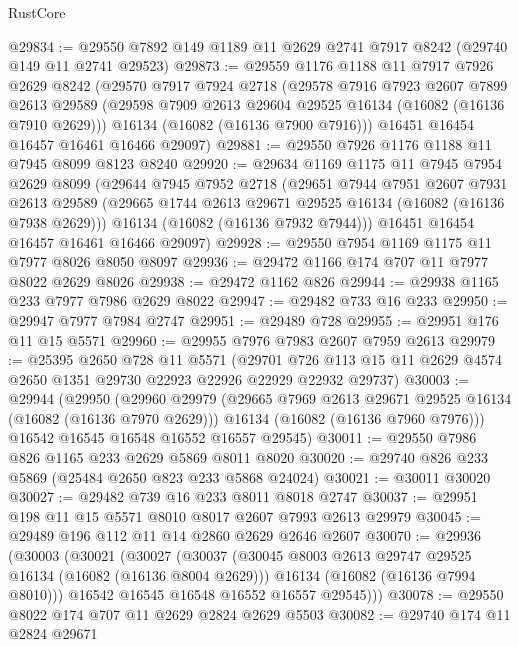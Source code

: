 \begin{lexlean}{RustCore}
\begin{coremodule}
@29834 := @29550 @7892 @149 @1189 @11 @2629 @2741 @7917 @8242 (@29740 @149 @11 @2741 @29523)
@29873 := @29559
    @1176
    @1188
    @11
    @7917
    @7926
    @2629
    @8242
    (@29570
      @7917
      @7924
      @2718
      (@29578
        @7916
        @7923
        @2607
        @7899
        @2613
        @29589
        (@29598 @7909 @2613 @29604 @29525 @16134 (@16082 (@16136 @7910 @2629)))
        @16134
        (@16082 (@16136 @7900 @7916)))
      @16451
      @16454
      @16457
      @16461
      @16466
      @29097)
@29881 := @29550 @7926 @1176 @1188 @11 @7945 @8099 @8123 @8240
@29920 := @29634
    @1169
    @1175
    @11
    @7945
    @7954
    @2629
    @8099
    (@29644
      @7945
      @7952
      @2718
      (@29651
        @7944
        @7951
        @2607
        @7931
        @2613
        @29589
        (@29665 @1744 @2613 @29671 @29525 @16134 (@16082 (@16136 @7938 @2629)))
        @16134
        (@16082 (@16136 @7932 @7944)))
      @16451
      @16454
      @16457
      @16461
      @16466
      @29097)
@29928 := @29550 @7954 @1169 @1175 @11 @7977 @8026 @8050 @8097
@29936 := @29472 @1166 @174 @707 @11 @7977 @8022 @2629 @8026
@29938 := @29472 @1162 @826
@29944 := @29938 @1165 @233 @7977 @7986 @2629 @8022
@29947 := @29482 @733 @16 @233
@29950 := @29947 @7977 @7984 @2747
@29951 := @29489 @728
@29955 := @29951 @176 @11 @15 @5571
@29960 := @29955 @7976 @7983 @2607 @7959 @2613
@29979 := @25395
    @2650
    @728
    @11
    @5571
    (@29701 @726 @113 @15 @11 @2629 @4574 @2650 @1351 @29730 @22923 @22926 @22929 @22932 @29737)
@30003 := @29944
    (@29950
      (@29960
        @29979
        (@29665 @7969 @2613 @29671 @29525 @16134 (@16082 (@16136 @7970 @2629)))
        @16134
        (@16082 (@16136 @7960 @7976)))
      @16542
      @16545
      @16548
      @16552
      @16557
      @29545)
@30011 := @29550 @7986 @826 @1165 @233 @2629 @5869 @8011 @8020
@30020 := @29740 @826 @233 @5869 (@25484 @2650 @823 @233 @5868 @24024)
@30021 := @30011 @30020
@30027 := @29482 @739 @16 @233 @8011 @8018 @2747
@30037 := @29951 @198 @11 @15 @5571 @8010 @8017 @2607 @7993 @2613 @29979
@30045 := @29489 @196 @112 @11 @14 @2860 @2629 @2646 @2607
@30070 := @29936
    (@30003
      (@30021
        (@30027
          (@30037
            (@30045 @8003 @2613 @29747 @29525 @16134 (@16082 (@16136 @8004 @2629)))
            @16134
            (@16082 (@16136 @7994 @8010)))
          @16542
          @16545
          @16548
          @16552
          @16557
          @29545)))
@30078 := @29550 @8022 @174 @707 @11 @2629 @2824 @2629 @5503
@30082 := @29740 @174 @11 @2824 @29671

\end{coremodule}
\end{lexlean}
